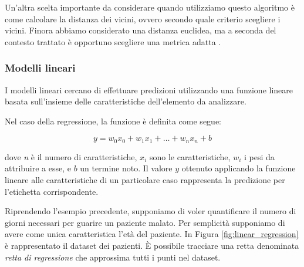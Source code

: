 \documentclass[a4paper,12pt]{report}
\begin{document}
Un'altra scelta importante da considerare quando utilizziamo questo algoritmo è come calcolare la distanza dei vicini, ovvero secondo quale criterio scegliere i vicini. Finora abbiamo considerato una distanza euclidea, ma a seconda del contesto trattato è opportuno scegliere una metrica adatta \cite{distance_metrics_knn}. 

\subsubsection{Modelli lineari}
I modelli lineari cercano di effettuare predizioni utilizzando una funzione lineare basata sull'insieme delle caratteristiche dell'elemento da analizzare.

Nel caso della regressione, la funzione è definita come segue: 

\begin{equation*}
    y  = w_0x_0 + w_1x_1 + \dots + w_nx_n + b
\end{equation*}

\noindent dove \textit{n} è il numero di caratteristiche, $x_i$ sono le caratteristiche, $w_i$ i pesi da attribuire a esse, e $b$ un termine noto.
Il valore $y$ ottenuto applicando la funzione lineare alle caratteristiche di un particolare caso rappresenta la predizione per l'etichetta corrispondente.

Riprendendo l'esempio precedente, supponiamo di voler quantificare il numero di giorni necessari per guarire un paziente malato. Per semplicità supponiamo di avere come unica caratteristica l'età del paziente. In Figura \ref{fig:linear_regression} è rappresentato il dataset dei pazienti. \`E possibile tracciare una retta denominata \textit{retta di regressione} che approssima tutti i punti nel dataset.
\end{document}
